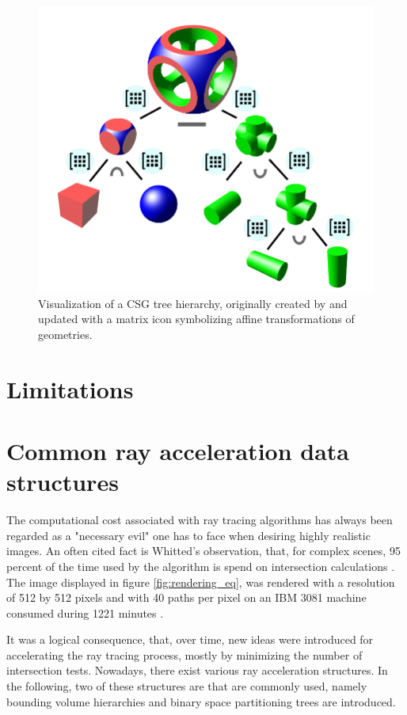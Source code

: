 \begin{figure}
	\centering
	\includegraphics[width=.9\linewidth]{img/1 fundamentals/csg_tree.png}
	\caption{Visualization of a CSG tree hierarchy, originally created by \cite{csgtree} and updated
	with a matrix icon symbolizing affine transformations of geometries.}
	\label{fig:csg_tree}
\end{figure}


\section{Limitations}




\section{Common ray acceleration data structures}
The computational cost associated with ray tracing algorithms has always been regarded as a "necessary evil" one has to face when desiring highly realistic images. An often cited fact is Whitted's observation, that, for complex scenes, 95 percent of the time used by the algorithm is spend on intersection calculations \cite[p 349]{whitted1979improved}. The image displayed in figure \ref{fig:rendering_eq}, was rendered with a resolution of 512 by 512 pixels and with 40 paths per pixel on an IBM 3081 machine consumed during 1221 minutes \cite[p 149]{kajiya1986rendering}. 

It was a logical consequence, that, over time, new ideas were introduced for accelerating the ray tracing process, mostly by minimizing the number of intersection tests. Nowadays, there exist various ray acceleration structures. In the following, two of these structures are that are commonly used, namely bounding volume hierarchies and binary space partitioning trees are introduced.

